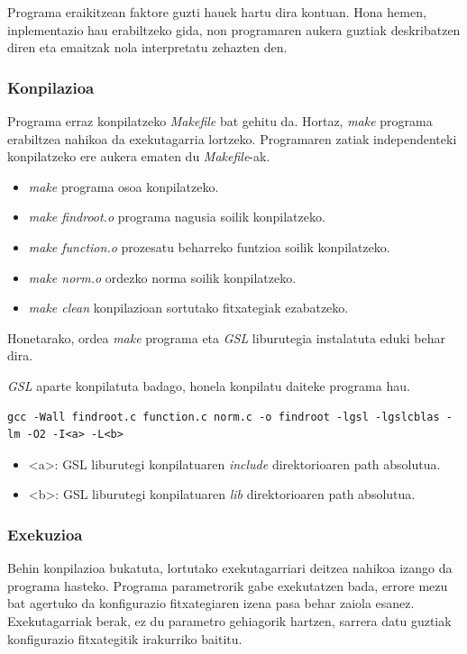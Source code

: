 \documentclass[10pt,a4paper,basque]{article}
\begin{document}
Programa eraikitzean faktore guzti hauek hartu dira kontuan. Hona hemen, inplementazio hau erabiltzeko gida, non programaren aukera guztiak deskribatzen diren eta emaitzak nola interpretatu zehazten den.

\subsubsection{Konpilazioa}

Programa erraz konpilatzeko \emph{Makefile} bat gehitu da. Hortaz, \emph{make} programa erabiltzea nahikoa da exekutagarria lortzeko. Programaren zatiak independenteki konpilatzeko ere aukera ematen du \emph{Makefile}-ak.

\begin{itemize}
\item \emph{make} programa osoa konpilatzeko.
\item \emph{make findroot.o} programa nagusia soilik konpilatzeko.
\item \emph{make function.o} prozesatu beharreko funtzioa soilik konpilatzeko.
\item \emph{make norm.o} ordezko norma soilik konpilatzeko.
\item \emph{make clean} konpilazioan sortutako fitxategiak ezabatzeko.
\end{itemize}

Honetarako, ordea \emph{make} programa eta \emph{GSL} liburutegia instalatuta eduki behar dira.

\emph{GSL} aparte konpilatuta badago, honela konpilatu daiteke programa hau.

\begin{lstlisting}
gcc -Wall findroot.c function.c norm.c -o findroot -lgsl -lgslcblas -lm -O2 -I<a> -L<b>
\end{lstlisting}

\begin{itemize}
\item <a>: GSL liburutegi konpilatuaren \emph{include} direktorioaren path absolutua.
\item <b>: GSL liburutegi konpilatuaren \emph{lib} direktorioaren path absolutua.
\end{itemize}

\subsubsection{Exekuzioa}

Behin konpilazioa bukatuta, lortutako exekutagarriari deitzea nahikoa izango da programa hasteko. Programa parametrorik gabe exekutatzen bada, errore mezu bat agertuko da konfigurazio fitxategiaren izena pasa behar zaiola esanez. Exekutagarriak berak, ez du parametro gehiagorik hartzen, sarrera datu guztiak konfigurazio fitxategitik irakurriko baititu.
\end{document}

